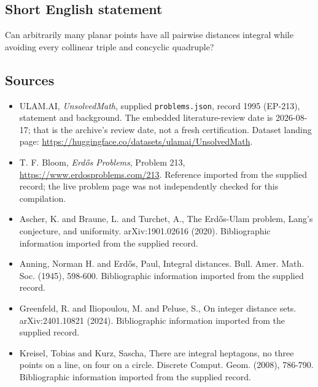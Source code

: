 \documentclass[11pt,a4paper]{article}
\begin{document}
\subsection{Short English statement}

Can arbitrarily many planar points have all pairwise distances integral while avoiding every collinear triple and concyclic quadruple?

\subsection{Sources}

{\small

\begin{itemize}

\item[\hypertarget{source:1995:1}{S1}] ULAM.AI, \emph{UnsolvedMath}, supplied \texttt{problems.json}, record 1995 (EP-213), statement and background. The embedded literature-review date is 2026-08-17; that is the archive’s review date, not a fresh certification. Dataset landing page: \url{https://huggingface.co/datasets/ulamai/UnsolvedMath}.

\item[\hypertarget{source:1995:2}{S2}] T. F. Bloom, \emph{Erdős Problems}, Problem 213, \url{https://www.erdosproblems.com/213}. Reference imported from the supplied record; the live problem page was not independently checked for this compilation.

\item[\hypertarget{source:1995:3}{S3}] Ascher, K. and Braune, L. and Turchet, A., The Erd\H{o}s-Ulam problem, Lang's conjecture, and uniformity. arXiv:1901.02616 (2020). Bibliographic information imported from the supplied record.

\item[\hypertarget{source:1995:4}{S4}] Anning, Norman H. and Erd\H{o}s, Paul, Integral distances. Bull. Amer. Math. Soc. (1945), 598-600. Bibliographic information imported from the supplied record.

\item[\hypertarget{source:1995:5}{S5}] Greenfeld, R. and Iliopoulou, M. and Peluse, S., On integer distance sets. arXiv:2401.10821 (2024). Bibliographic information imported from the supplied record.

\item[\hypertarget{source:1995:6}{S6}] Kreisel, Tobias and Kurz, Sascha, There are integral heptagons, no three points on a line, on four on a circle. Discrete Comput. Geom. (2008), 786-790. Bibliographic information imported from the supplied record.

\end{itemize}

}

\label{end:1995}
\end{document}
